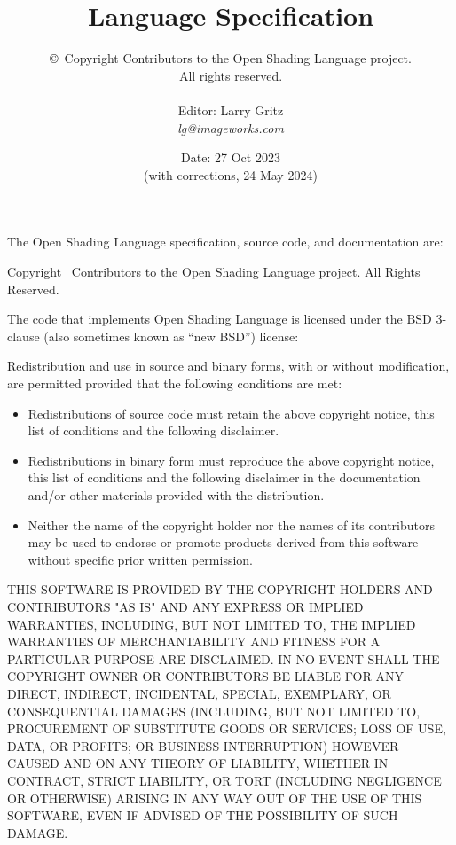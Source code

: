 \documentclass[11pt,letterpaper]{book}
\title{
{\Huge{\bf \product}
{\bf\sffamily \versionnumber} \medskip \\ \huge
Language Specification
} \bigskip }
\author{
\copyright\ Copyright Contributors to the Open Shading Language project. \\
All rights reserved.
 \bigskip \\
\vspace{1in} \\
Editor: Larry Gritz \\
\emph{lg@imageworks.com}
}
\date{{\large Date: 27 Oct 2023 \\
 (with corrections, 24 May 2024)
}
\bigskip
\bigskip
\bigskip
\bigskip
}
\begin{document}
\frontmatter

\maketitle

\newpage
\label{speccopyr}

\vspace*{0.2in}

\noindent The Open Shading Language specification, source code, and
documentation are:

\vspace*{0.2in}

Copyright \textcopyright\ Contributors to the Open Shading
Language project. All Rights Reserved.

\vspace{0.5in}

The code that implements Open Shading Language is licensed under
the BSD 3-clause (also sometimes known as ``new BSD'') license:

\vspace{0.25in}

Redistribution and use in source and binary forms, with or without
modification, are permitted provided that the following conditions are
met:

\begin{itemize}
\item Redistributions of source code must retain the above copyright
  notice, this list of conditions and the following disclaimer.
\item Redistributions in binary form must reproduce the above copyright
  notice, this list of conditions and the following disclaimer in the
  documentation and/or other materials provided with the distribution.
\item Neither the name of the copyright holder nor the names of its
  contributors may be used to endorse or promote products derived from
  this software without specific prior written permission.
\end{itemize}

THIS SOFTWARE IS PROVIDED BY THE COPYRIGHT HOLDERS AND CONTRIBUTORS
"AS IS" AND ANY EXPRESS OR IMPLIED WARRANTIES, INCLUDING, BUT NOT
LIMITED TO, THE IMPLIED WARRANTIES OF MERCHANTABILITY AND FITNESS FOR
A PARTICULAR PURPOSE ARE DISCLAIMED. IN NO EVENT SHALL THE COPYRIGHT
OWNER OR CONTRIBUTORS BE LIABLE FOR ANY DIRECT, INDIRECT, INCIDENTAL,
SPECIAL, EXEMPLARY, OR CONSEQUENTIAL DAMAGES (INCLUDING, BUT NOT
LIMITED TO, PROCUREMENT OF SUBSTITUTE GOODS OR SERVICES; LOSS OF USE,
DATA, OR PROFITS; OR BUSINESS INTERRUPTION) HOWEVER CAUSED AND ON ANY
THEORY OF LIABILITY, WHETHER IN CONTRACT, STRICT LIABILITY, OR TORT
(INCLUDING NEGLIGENCE OR OTHERWISE) ARISING IN ANY WAY OUT OF THE USE
OF THIS SOFTWARE, EVEN IF ADVISED OF THE POSSIBILITY OF SUCH DAMAGE.
\end{document}
